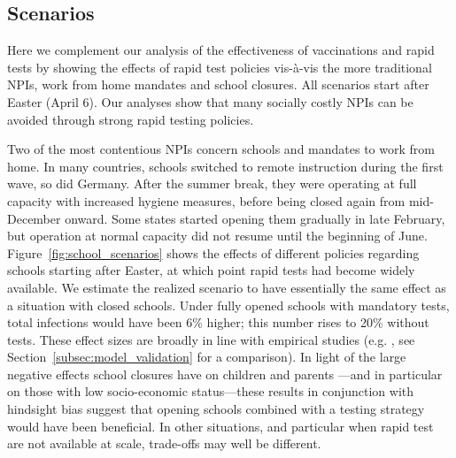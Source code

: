 \subsection{Scenarios}
\label{subsec:appendix_scenarios}

Here we complement our analysis of the effectiveness of vaccinations and
rapid tests by showing the effects of rapid test policies vis-à-vis the more traditional
NPIs, work from home mandates and school closures. All scenarios start after Easter
(April 6). Our analyses show that many socially costly NPIs can be avoided through strong
rapid testing policies.

Two of the most contentious NPIs concern schools and mandates to work from home. In many
countries, schools switched to remote instruction during the first wave, so did Germany.
After the summer break, they were operating at full capacity with increased hygiene
measures, before being closed again from mid-December onward. Some states started opening
them gradually in late February, but operation at normal capacity did not resume until
the beginning of June. Figure~\ref{fig:school_scenarios} shows the effects of different
policies regarding schools starting after Easter, at which point rapid tests had become
widely available. We estimate the realized scenario to have essentially the same effect
as a situation with closed schools. Under fully opened schools with mandatory tests,
total infections would have been 6\% higher; this number rises to 20\% without tests.
These effect sizes are broadly in line with empirical studies (e.g. \citet{Vlachos2021,
Berger2021}, see Section~\ref{subsec:model_validation} for a comparison). In light of the
large negative effects school closures have on children and parents \citep{Luijten2021,
Melegari2021}---and in particular on those with low socio-economic status---these results
in conjunction with hindsight bias suggest that opening schools combined with a testing
strategy would have been beneficial. In other situations, and particular when rapid test
are not available at scale, trade-offs may well be different.

